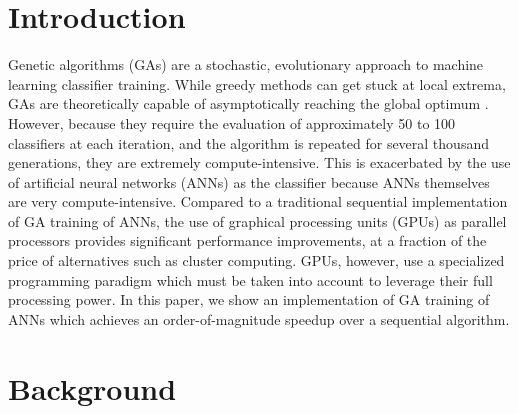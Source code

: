 \documentclass[11pt]{article}       %
\begin{document}
\section{Introduction} \label{intro}
Genetic algorithms (GAs) are a stochastic, evolutionary approach to machine learning classifier training. While greedy methods can get stuck at local extrema, GAs  are theoretically capable of asymptotically reaching the global optimum \cite{GA-ANN}. However, because they require the evaluation of approximately 50 to 100 classifiers at each iteration, and the algorithm is repeated for several thousand generations, they are extremely compute-intensive. This is exacerbated by the use of artificial neural networks (ANNs) as the classifier because ANNs themselves are very compute-intensive. Compared to a traditional sequential implementation of GA training of ANNs, the use of graphical processing units (GPUs) as parallel processors provides significant performance improvements, at a fraction of the price of alternatives such as cluster computing. GPUs, however, use a specialized programming paradigm which must be taken into account to leverage their full processing power. In this paper, we show an implementation of GA training of ANNs which achieves an order-of-magnitude speedup over a sequential algorithm.

\section{Background} \label{background}

\end{document}
